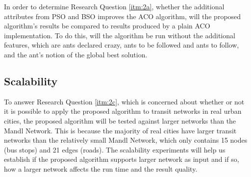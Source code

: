 In order to determine Research Question \vref{itm:2a}, whether the additional attributes from PSO and BSO improves the ACO algorithm, will the proposed algorithm's results be compared to results produced by a plain ACO implementation. To do this, will the algorithm  be run without the additional features, which are ants declared crazy, ants to be followed and ants to follow, and the ant's notion of the global best solution.

\subsection{Scalability}
To answer Research Question \vref{itm:2c}, which is concerned about whether or not it is possible to apply the proposed algorithm to transit networks in real urban cities, the proposed algorithm will be tested against larger networks than the Mandl Network. This is because the majority of real cities have larger transit networks than the relatively small Mandl Network, which only contains 15 nodes (bus stops) and 21 edges (roads). The scalability experiments will help us establish if the proposed algorithm supports larger network as input and if so, how a larger network affects the run time and the result quality. 





